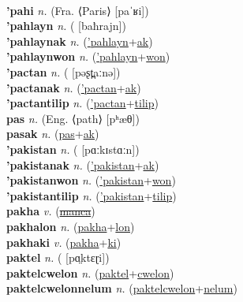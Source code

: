  \label{pahopoltilum} \\
\textbf{'pahi} \textit{n.} (Fra. ⟨Paris⟩ [paˈʁi])
 \label{'pahi} \\
\textbf{'pahlayn} \textit{n.} ( [baħrajn])
 \label{'pahlayn} \\
\textbf{'pahlaynak} \textit{n.} (\hyperref['pahlayn]{'pahlayn}+\hyperref[ak]{ak})
 \label{'pahlaynak} \\
\textbf{'pahlaynwon} \textit{n.} (\hyperref['pahlayn]{'pahlayn}+\hyperref[won]{won})
 \label{'pahlaynwon} \\
\textbf{'pactan} \textit{n.} ( [pəʂt̪aːnə])
 \label{'pactan} \\
\textbf{'pactanak} \textit{n.} (\hyperref['pactan]{'pactan}+\hyperref[ak]{ak})
 \label{'pactanak} \\
\textbf{'pactantilip} \textit{n.} (\hyperref['pactan]{'pactan}+\hyperref[tilip]{tilip})
 \label{'pactantilip} \\
\textbf{pas} \textit{n.} (Eng. ⟨path⟩ [pʰæθ])
 \label{pas} \\
\textbf{pasak} \textit{n.} (\hyperref[pas]{pas}+\hyperref[ak]{ak})
 \label{pasak} \\
\textbf{'pakistan} \textit{n.} ( [pɑːkɪstɑːn])
 \label{'pakistan} \\
\textbf{'pakistanak} \textit{n.} (\hyperref['pakistan]{'pakistan}+\hyperref[ak]{ak})
 \label{'pakistanak} \\
\textbf{'pakistanwon} \textit{n.} (\hyperref['pakistan]{'pakistan}+\hyperref[won]{won})
 \label{'pakistanwon} \\
\textbf{'pakistantilip} \textit{n.} (\hyperref['pakistan]{'pakistan}+\hyperref[tilip]{tilip})
 \label{'pakistantilip} \\
\textbf{pakha} \textit{v.} (\hyperref[manca]{\sout{manca}})
 \label{pakha} \\
\textbf{pakhalon} \textit{n.} (\hyperref[pakha]{pakha}+\hyperref[lon]{lon})
 \label{pakhalon} \\
\textbf{pakhaki} \textit{v.} (\hyperref[pakha]{pakha}+\hyperref[ki]{ki})
 \label{pakhaki} \\
\textbf{paktel} \textit{n.} ( [pɑ̤ktɛɽi])
 \label{paktel} \\
\textbf{paktelcwelon} \textit{n.} (\hyperref[paktel]{paktel}+\hyperref[cwelon]{cwelon})
 \label{paktelcwelon} \\
\textbf{paktelcwelonnelum} \textit{n.} (\hyperref[paktelcwelon]{paktelcwelon}+\hyperref[nelum]{nelum})
 \label{paktelcwelonnelum} \\
